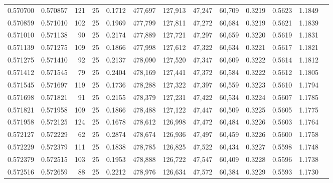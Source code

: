 \begin{tabular}{rrrrrrrrrrrrr}
0.570700 & 0.570857 &   121 &  25 &                                     0.1712 & 477,697 & 127,913 &  47,247 &  60,709 & 0.3219 & 0.5623 & 1.1849 \\
0.570859 & 0.571010 &   102 &  25 &                                     0.1969 & 477,799 & 127,811 &  47,272 &  60,684 & 0.3219 & 0.5621 & 1.1839 \\
0.571010 & 0.571138 &    90 &  25 &                                     0.2174 & 477,889 & 127,721 &  47,297 &  60,659 & 0.3220 & 0.5619 & 1.1831 \\
0.571139 & 0.571275 &   109 &  25 &                                     0.1866 & 477,998 & 127,612 &  47,322 &  60,634 & 0.3221 & 0.5617 & 1.1821 \\
0.571275 & 0.571410 &    92 &  25 &                                     0.2137 & 478,090 & 127,520 &  47,347 &  60,609 & 0.3222 & 0.5614 & 1.1812 \\
0.571412 & 0.571545 &    79 &  25 &                                     0.2404 & 478,169 & 127,441 &  47,372 &  60,584 & 0.3222 & 0.5612 & 1.1805 \\
0.571545 & 0.571697 &   119 &  25 &                                     0.1736 & 478,288 & 127,322 &  47,397 &  60,559 & 0.3223 & 0.5610 & 1.1794 \\
0.571698 & 0.571821 &    91 &  25 &                                     0.2155 & 478,379 & 127,231 &  47,422 &  60,534 & 0.3224 & 0.5607 & 1.1785 \\
0.571821 & 0.571958 &   109 &  25 &                                     0.1866 & 478,488 & 127,122 &  47,447 &  60,509 & 0.3225 & 0.5605 & 1.1775 \\
0.571958 & 0.572125 &   124 &  25 &                                     0.1678 & 478,612 & 126,998 &  47,472 &  60,484 & 0.3226 & 0.5603 & 1.1764 \\
0.572127 & 0.572229 &    62 &  25 &                                     0.2874 & 478,674 & 126,936 &  47,497 &  60,459 & 0.3226 & 0.5600 & 1.1758 \\
0.572229 & 0.572379 &   111 &  25 &                                     0.1838 & 478,785 & 126,825 &  47,522 &  60,434 & 0.3227 & 0.5598 & 1.1748 \\
0.572379 & 0.572515 &   103 &  25 &                                     0.1953 & 478,888 & 126,722 &  47,547 &  60,409 & 0.3228 & 0.5596 & 1.1738 \\
0.572516 & 0.572659 &    88 &  25 &                                     0.2212 & 478,976 & 126,634 &  47,572 &  60,384 & 0.3229 & 0.5593 & 1.1730 \\

\end{tabular}
